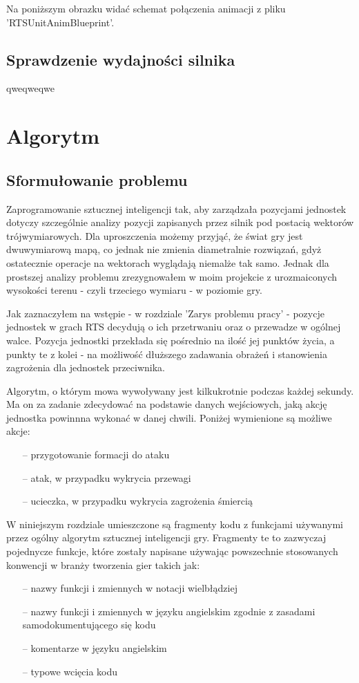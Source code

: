 \documentclass[12pt]{report}
\begin{document}
Na poniższym obrazku widać schemat połączenia animacji z pliku 'RTSUnitAnimBlueprint'.



\section{Sprawdzenie wydajności silnika}
qweqweqwe
\chapter{Algorytm}
\section{Sformułowanie problemu}
Zaprogramowanie sztucznej inteligencji tak, aby zarządzała pozycjami jednostek dotyczy szczególnie analizy pozycji zapisanych przez silnik pod postacią wektorów trójwymiarowych. Dla uproszczenia możemy przyjąć, że świat gry jest dwuwymiarową mapą, co jednak nie zmienia diametralnie rozwiązań, gdyż ostatecznie operacje na wektorach wyglądają niemalże tak samo. Jednak dla prostszej analizy problemu zrezygnowałem w moim projekcie z urozmaiconych wysokości terenu - czyli trzeciego wymiaru - w poziomie gry.

Jak zaznaczyłem na wstępie - w rozdziale 'Zarys problemu pracy' - pozycje jednostek w grach RTS decydują o ich przetrwaniu oraz o przewadze w ogólnej walce. Pozycja jednostki przekłada się pośrednio na ilość jej punktów życia, a punkty te z kolei - na możliwość dłuższego zadawania obrażeń i stanowienia zagrożenia dla jednostek przeciwnika.

Algorytm, o którym mowa wywoływany jest kilkukrotnie podczas każdej sekundy. Ma on za zadanie zdecydować na podstawie danych wejściowych, jaką akcję jednostka powinnna wykonać w danej chwili. Poniżej wymienione są możliwe akcje:
\begin{itemize}
\item[--] przygotowanie formacji do ataku
\item[--] atak, w przypadku wykrycia przewagi
\item[--] ucieczka, w przypadku wykrycia zagrożenia śmiercią
\end{itemize}

W niniejszym rozdziale umieszczone są fragmenty kodu z funkcjami używanymi przez ogólny algorytm sztucznej inteligencji gry. Fragmenty te to zazwyczaj pojednycze funkcje, które zostały napisane używając powszechnie stosowanych konwencji w branży tworzenia gier takich jak:
\begin{itemize}
\item[--] nazwy funkcji i zmiennych w notacji wielbłądziej
\item[--] nazwy funkcji i zmiennych w języku angielskim zgodnie z zasadami samodokumentującego się kodu
\item[--] komentarze w języku angielskim
\item[--] typowe wcięcia kodu
\end{itemize}
\end{document}
